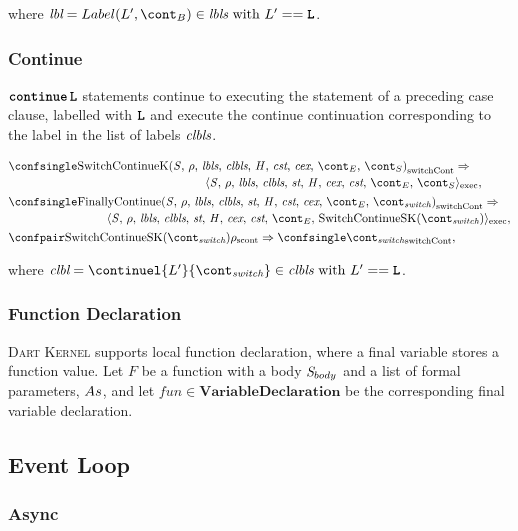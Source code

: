 \documentclass[a4paper,oneside,fleqn]{article}
\newcommand{\kernel}{\textsc{Dart Kernel}}
\newcommand{\synt}[1]{\ensuremath{\text{\textbf{\texttt{#1}}}}}
\DeclareMathOperator{\continue}{\synt{continue}}
\newcommand{\dvardecl}{\mathbf{VariableDeclaration}}
\newcommand{\cesktrans}[2]{\ensuremath{{#1} \Rightarrow {#2}}}
\newcommand{\cesktranssplit}[2]{\ensuremath{{#1} \Rightarrow\\ {#2}}}
\begin{document}
\noindent where $\lbl = Label(L', \bcont) \in \lbls \text{ with } L' == \synt{L}$.


\subsubsection{Continue}

$\continue \synt{L}$ statements continue to executing the statement of a preceding case clause, labelled with $\synt{L}$ and execute the continue continuation corresponding to the label in the list of labels $\textit{clbls}$.

\begin{align*}
    &\begin{multlined}
        \cesktranssplit%
            {\switchconf{\ContinueK}}%
            {\execconf{\stmt}{\env}{\lbls}{\clbls}{\strace}{\handler}{\cex,\,\cstrace}{\econt}{\scont}},
    \end{multlined}\\
    &\begin{multlined}
        \cesktranssplit%
            {\switchconf{\FinallyContinue{\stmt}{\switchcont}}}%
            {\execconf{\stmt}{\env}{\lbls}{\clbls}{\strace}{\handler}{\cex,\,\cstrace}{\econt}{\mathrm{SwitchContinueSK}(\switchcont)}},
    \end{multlined}\\
    &\cesktrans%
        {\scontconf{\mathrm{SwitchContinueSK}(\switchcont)}{\env}}%
        {\switchconf{\switchcont}},
\end{align*}

\noindent where $\clbl = \continuel{L'}{\switchcont} \in \clbls \text{ with } L' == \synt{L}$.


\subsubsection{Function Declaration}

\kernel{} supports local function declaration, where a final variable stores a function value.
Let $F$ be a function with a body $\mathit{S}_{body}$ and a list of formal parameters, $As$, and let $fun \in \dvardecl$ be the corresponding final variable declaration.


\subsection{Event Loop}
\label{subsec:eventloop}


\subsubsection{Async}
\label{subsubsec:async}
\end{document}
